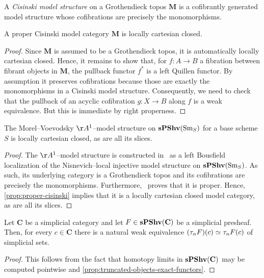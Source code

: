 \begin{definition}
  A \emph{Cisinski model structure} on a Grothendieck topos
  \(\mathbf M\) is a cofibrantly generated model structure whose
  cofibrations are precisely the monomorphisms.
\end{definition}

\begin{proposition}\label{prop:proper-cisinski}
  A proper Cisinski model category \(\mathbf M\) is locally cartesian closed.
\end{proposition}
\begin{proof}
  Since \(\mathbf M\) is assumed to be a Grothendieck topos, it is automatically
  locally cartesian closed. Hence, it remains to show that, for \(f\colon A\to
  B\) a fibration between fibrant objects in \(\mathbf M\), the pullback functor
  \(f^*\) is a left Quillen functor. By assumption it preserves cofibrations
  because those are exactly the monomorphisms in a Cisinski model structure.
  Consequently, we need to check that the pullback of an acyclic cofibration
  \(g\colon X\to B\) along \(f\) is a weak equivalence. But this is immediate by
  right properness.
\end{proof}

\begin{corollary}
  The Morel--Voevodsky \(\AA^1\)--model structure on
  \(\operatorname{\textnormal{\bfseries sPShv}}(\operatorname{\textnormal{Sm}}_{S})\) for a base scheme \(S\) is locally cartesian
  closed, as are all its slices.
\end{corollary}
\begin{proof}
  The \(\AA^1\)--model structure is constructed in~\cite{mv} as a left Bousfield
  localization of the Nisnevich--local injective model structure on
  \(\operatorname{\textnormal{\bfseries sPShv}}(\operatorname{\textnormal{Sm}}_{S})\). As such, its underlying category is a Grothendieck topos
  and its cofibrations are precisely the monomorphisms. Furthermore,~\cite{mv}
  proves that it is proper. Hence, \autoref{prop:proper-cisinski} implies that
  it is a locally cartesian closed model category, as are all its slices.
\end{proof}

\begin{lemma}\label{lem:trunc-presheaves}
  Let \(\mathbf C\) be a simplicial category and let
  \(F\in\operatorname{\textnormal{\bfseries sPShv}}(\mathbf C)\) be a simplicial presheaf. Then, for every
  \(c\in\mathbf C\) there is a natural weak equivalence
  \((\tau_{n}F)(c)\simeq \tau_{n}F(c)\) of simplicial sets.
\end{lemma}
\begin{proof}
  This follows from the fact that homotopy limits in \(\operatorname{\textnormal{\bfseries sPShv}}(\mathbf
  C)\) may be computed pointwise and
  \autoref{prop:truncated-objects-exact-functors}.
\end{proof}

